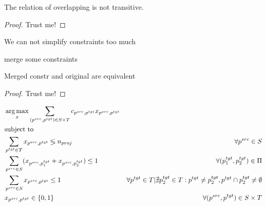 \begin{theorem}
    The relation of overlapping is not transitive.
\end{theorem}
\begin{proof}
    Trust me!
\end{proof}

\begin{corollary}
    We can not simplify constraints too much
\end{corollary}

merge some constraints
\begin{theorem}
    Merged constr and original are equivalent
\end{theorem}
\begin{proof}
    Trust me!
\end{proof}

\begin{equation}
    \begin{aligned}
         & \operatorname*{arg\,max}\limits_x \sum\limits_{(p^{src}, p^{tgt}) \in S \times T} c_{p^{src}, p^{tgt}} x_{p^{src}, p^{tgt}}                                                                                                                   \\
         & \text{subject to} \notag                                                                                                                                                                                                     \\
         & \sum\limits_{p^{tgt} \in T} x_{p^{src}, p^{tgt}} \lessgtr n_{proj}                                         & \forall p^{src} \in S                                                                                           \\
         & \sum\limits_{p^{src} \in S} (x_{p^{src}, p_1^{tgt}} + x_{p^{src}, p_2^{tgt}}) \leq 1                       & \forall (p_1^{tgt}, p_2^{tgt}) \in \Pi                                                                          \\
         & \sum\limits_{p^{src} \in S} x_{p^{src}, p^{tgt}} \leq 1                                                    & \forall p^{tgt} \in T | \nexists p_2^{tgt} \in T: p^{tgt} \neq p_2^{tgt}, p^{tgt} \cap p_2^{tgt} \neq \emptyset \\
         & x_{p^{src}, p^{tgt}} \in \{ 0, 1 \}                                                                        & \forall (p^{src}, p^{tgt}) \in S \times T
    \end{aligned}
\end{equation}


